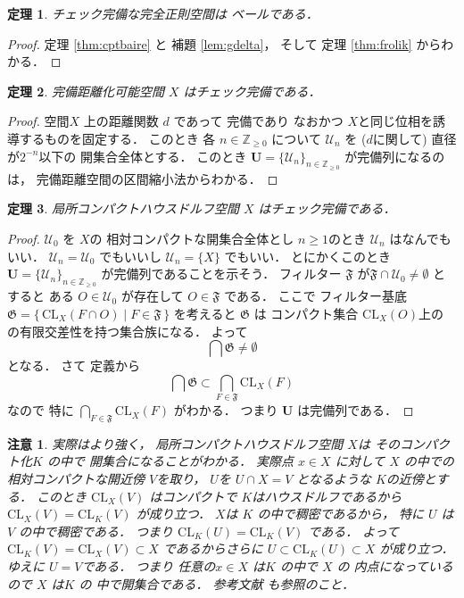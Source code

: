 \documentclass[leqno, a4paper, 12pt]{jsarticle}
\newtheorem{thm}{定理}
\newtheorem*{rmk}{注意}
\newcommand{\zz}{\mathbb{Z}}
\newcommand{\cl}{\mathrm{CL}}
\begin{document}
\begin{thm}\label{thm:cechcechbaire}
チェック完備な完全正則空間は
ベールである．
\end{thm}
\begin{proof}
定理
\ref{thm:cptbaire}
と
補題
\ref{lem:gdelta}，
そして
定理
\ref{thm:frolik}
からわかる．
\end{proof}

\begin{thm}\label{thm:cechcomp}
完備距離化可能空間
$X$
はチェック完備である．
\end{thm}
\begin{proof}
空間$X$
上の距離関数
$d$
であって
完備であり
なおかつ
$X$と同じ位相を誘導するものを固定する．
このとき
各
$n\in \zz_{\ge 0}$
について
$\mathcal{U}_{n}$
を
($d$に関して)
直径が$2^{-n}$以下の
開集合全体とする．
このとき
$\mathbf{U}=\{\mathcal{U}_{n}\}_{n\in \zz_{\ge 0}}$
が完備列になるのは，
完備距離空間の区間縮小法からわかる．
\end{proof}


\begin{thm}\label{thm:cechloccpt}
局所コンパクトハウスドルフ空間
$X$
はチェック完備である．
\end{thm}
\begin{proof}
$\mathcal{U}_{0}$
を
$X$の
相対コンパクトな開集合全体とし
$n\ge 1$のとき
$\mathcal{U}_{n}$
はなんでもいい．
$\mathcal{U}_{n}=\mathcal{U}_{0}$
でもいいし
$\mathcal{U}_{n}=\{ X\}$
でもいい．
とにかくこのとき
$\mathbf{U}=\{\mathcal{U}_{n}\}_{n\in \zz_{\ge 0}}$
が完備列であることを示そう．
フィルター
$\mathfrak{F}$
が$\mathfrak{F}\cap \mathcal{U}_{0}\neq \emptyset$
とすると
ある
$O\in \mathcal{U}_{0}$
が存在して
$O\in \mathfrak{F}$
である．
ここで
フィルター基底
$\mathfrak{G}=\{\, \cl_{X}(F\cap O) \mid F\in \mathfrak{F}\, \}$
を考えると
$\mathfrak{G}$
は
コンパクト集合
$\cl_{X}(O)$上の
の有限交差性を持つ集合族になる．
よって
\[
\bigcap\mathfrak{G}\neq \emptyset
\]
となる．
さて
定義から
\[
\bigcap\mathfrak{G}\subset \bigcap_{F\in \mathfrak{F}}
\cl_{X}(F)
\]
なので
特に
$ \bigcap_{F\in \mathfrak{F}}
\cl_{X}(F)$
がわかる．
つまり
$\mathbf{U}$
は完備列である．
\end{proof}

\begin{rmk}
実際はより強く，
局所コンパクトハウスドルフ空間
$X$は
そのコンパクト化$K$
の中で
開集合になることがわかる．
実際点
$x\in X$
に対して
$X$
の中での相対コンパクトな開近傍
$V$を取り，
$U$を
$U\cap X=V$
となるような
$K$の近傍とする．
このとき
$\cl_{X}(V)$
はコンパクトで
$K$はハウスドルフであるから
$\cl_{X}(V)=\cl_{K}(V)$
が成り立つ．
$X$は
$K$
の中で稠密であるから，
特に
$U$
は
$V$
の中で稠密である．
つまり
$\cl_{K}(U)=\cl_{K}(V)$
である．
よって
$\cl_{K}(V)=\cl_{X}(V)\subset X$
であるからさらに
$U\subset \cl_{K}(U)\subset X$
が成り立つ．
ゆえに
$U=V$である．
つまり
任意の$x\in X$
は$K$
の中で
$X$
の
内点になっている
ので
$X$
は$K$
の
中で開集合である．
参考文献
\cite{Den2}
も参照のこと．
\end{rmk}
\end{document}
